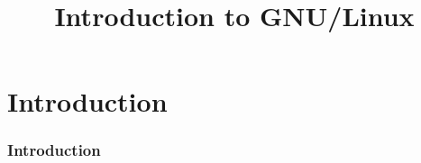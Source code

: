 \documentclass{beamer}
\title[GNU/Linux]{Introduction to GNU/Linux }
\author{}
\institute[FISAT]{{\large Federal Institute of Science and Technology}}
\begin{document}
\begin{frame}[allowframebreaks]
\titlepage
\end{frame}


\section{Introduction}
\begin{frame}
\frametitle{Introduction}
\end{frame}
\end{document}

